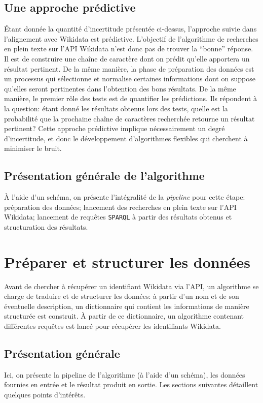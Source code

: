 \documentclass[a4paper, 12pt, twoside]{book}
\newcommand{\sparql}{\texttt{SPARQL}}
\begin{document}
\subsection{Une approche prédictive}
Étant donnée la quantité d'incertitude présentée ci-dessus, l'approche suivie dans l'alignement avec Wikidata est prédictive. L'objectif de l'algorithme de recherches en plein texte sur l'API Wikidata n'est donc pas de trouver la \enquote{bonne} réponse. Il est de construire une chaîne de caractère dont on prédit qu'elle apportera un résultat pertinent. De la même manière, la phase de préparation des données est un processus qui sélectionne et normalise certaines informations dont on suppose qu'elles seront pertinentes dans l'obtention des bons résultats. De la même manière, le premier rôle des tests est de quantifier les prédictions. Ils répondent à la question: étant donné les résultats obtenus lors des tests, quelle est la probabilité que la prochaine chaîne de caractères recherchée retourne un résultat pertinent? Cette approche prédictive implique nécessairement un degré d'incertitude, et donc le développement d'algorithmes flexibles qui cherchent à minimiser le bruit.

\subsection{Présentation générale de l'algorithme}
À l'aide d'un schéma, on présente l'intégralité de la \textit{pipeline} pour cette étape: préparation des données; lancement des recherches en plein texte sur l'API Wikidata; lancement de requêtes \sparql{} à partir des résultats obtenus et structuration des résultats. 

\section{Préparer et structurer les données}
Avant de chercher à récupérer un identifiant Wikidata via l'API, un algorithme se charge de traduire et de structurer les données: à partir d'un nom et de son éventuelle description, un dictionnaire qui contient les informations de manière structurée est construit. À partir de ce dictionnaire, un algorithme contenant différentes requêtes est lancé pour récupérer les identifiants Wikidata.

\subsection{Présentation générale}
Ici, on présente la pipeline de l'algorithme (à l'aide d'un schéma), les données fournies en entrée et le résultat produit en sortie. Les sections suivantes détaillent quelques points d'intérêts.
\end{document}
